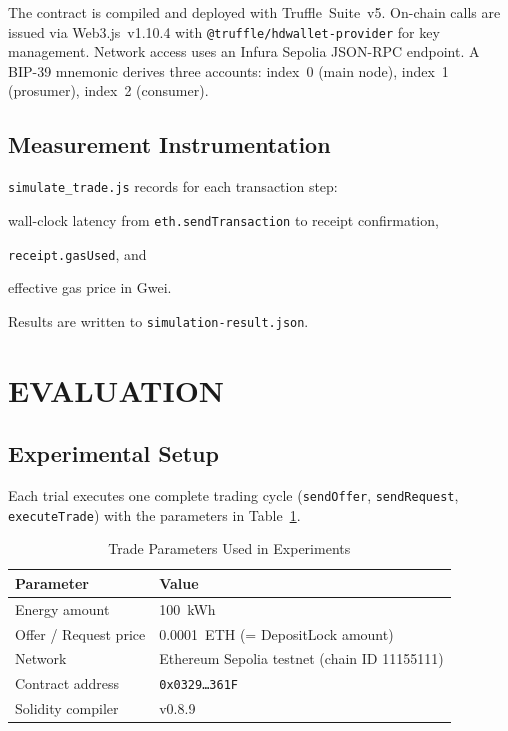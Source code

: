\documentclass{IEEEoj}
\begin{document}
The contract is compiled and deployed with Truffle~Suite~v5.
On-chain calls are issued via Web3.js~v1.10.4 with
\texttt{@truffle/hdwallet-provider} for key management.
Network access uses an Infura Sepolia JSON-RPC endpoint.
A BIP-39 mnemonic derives three accounts: index~0 (main node),
index~1 (prosumer), index~2 (consumer).

\subsection{Measurement Instrumentation}

\texttt{simulate\_trade.js} records for each transaction step:
\begin{enumerate*}[label=(\roman*)]
  \item wall-clock latency from \texttt{eth.sendTransaction} to receipt
        confirmation,
  \item \texttt{receipt.gasUsed}, and
  \item effective gas price in Gwei.
\end{enumerate*}
Results are written to \texttt{simulation-result.json}.


\section{EVALUATION}
\label{sec:evaluation}

\subsection{Experimental Setup}

Each trial executes one complete trading cycle (\texttt{sendOffer},
\texttt{sendRequest}, \texttt{executeTrade}) with the parameters in
Table~\ref{tab:params}.

\begin{table}[t]
\caption{Trade Parameters Used in Experiments}
\label{tab:params}
\centering
\begin{tabular}{ll}
\toprule
\textbf{Parameter} & \textbf{Value} \\
\midrule
Energy amount              & 100~kWh \\
Offer / Request price      & 0.0001~ETH (= DepositLock amount) \\
Network                    & Ethereum Sepolia testnet (chain ID 11155111) \\
Contract address           & \texttt{0x0329\ldots361F} \\
Solidity compiler          & v0.8.9 \\
\bottomrule
\end{tabular}
\end{table}
\end{document}
